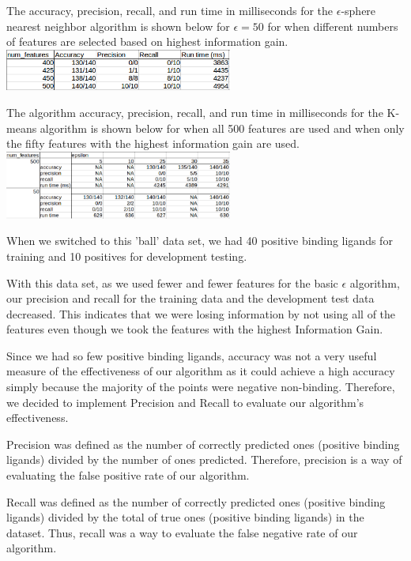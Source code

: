 \documentclass[11pt,letterpaper]{article}
\begin{document}
The accuracy, precision, recall, and run time in milliseconds for the $\epsilon$-sphere nearest neighbor algorithm is shown below for $\epsilon=50$ for when different numbers of features are selected based on highest information gain. \\

\includegraphics[width=75mm]{epsNNVaryFeaturesData.png}

The algorithm accuracy, precision, recall, and run time in milliseconds for the K-means algorithm is shown below for when all 500 features are used and when only the fifty features with the highest information gain are used. \\

\includegraphics[width=75mm]{kMeansData.png}


When we switched to this 'ball' data set, we had 40 positive binding ligands for training and 10 positives for development testing.

With this data set, as we used fewer and fewer features for the basic $\epsilon$ algorithm, our precision and recall for the training data and the development test data decreased.  This indicates that we were losing information by not using all of the features even though we took the features with the highest Information Gain.


Since we had so few positive binding ligands, accuracy was not a very useful measure of the effectiveness of our algorithm as it could achieve a high accuracy simply because the majority of the points were negative non-binding.  Therefore, we decided to implement Precision and Recall to evaluate our algorithm's effectiveness.

Precision was defined as the number of correctly predicted ones (positive binding ligands) divided by the number of ones predicted.  Therefore, precision is a way of evaluating the false positive rate of our algorithm.

Recall was defined as the number of correctly predicted ones (positive binding ligands) divided by the total of true ones (positive binding ligands) in the dataset.  Thus, recall was a way to evaluate the false negative rate of our algorithm.
\end{document}
